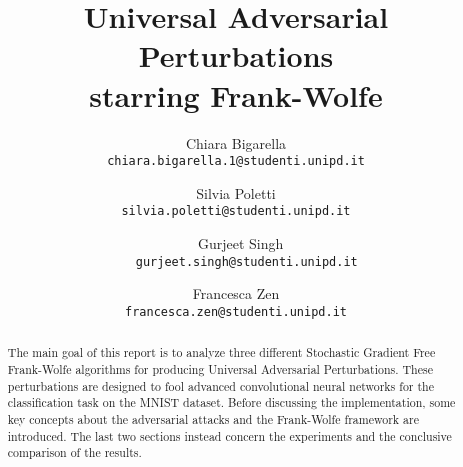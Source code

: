 \documentclass[10pt,twocolumn,letterpaper]{article}
\begin{document}
\title{Universal Adversarial Perturbations \\ starring Frank-Wolfe}
\author{Chiara Bigarella\\{\tt\footnotesize chiara.bigarella.1@studenti.unipd.it}\and \qquad Silvia Poletti\\{\qquad \tt\footnotesize silvia.poletti@studenti.unipd.it}\and \, \,Gurjeet Singh\\{\tt\footnotesize \,\, gurjeet.singh@studenti.unipd.it}\and \qquad \quad  Francesca Zen\\{\qquad \quad  \tt\footnotesize francesca.zen@studenti.unipd.it}}
\maketitle

\begin{abstract}
	The main goal of this report is to analyze three different Stochastic Gradient Free Frank-Wolfe algorithms for producing
	Universal Adversarial Perturbations. These perturbations are designed to fool advanced convolutional neural networks for
	the classification task on the MNIST dataset. Before discussing the implementation, some key concepts about the adversarial
	attacks and the Frank-Wolfe framework are introduced. The last two sections instead concern the experiments and the conclusive comparison of the results.
\end{abstract}













{\small
	
	
}
\end{document}
